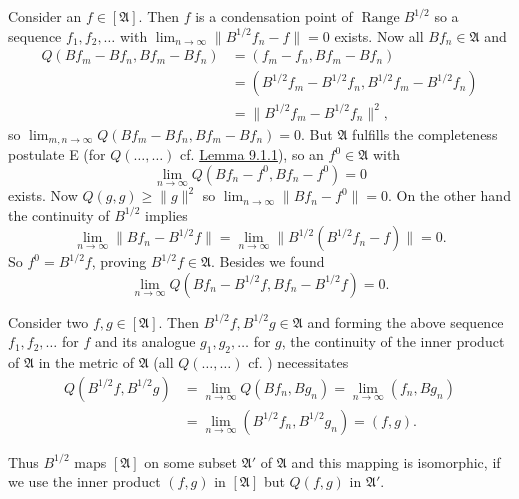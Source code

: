 \documentclass[12pt,b5paper,twoside]{article}
\newcommand{\lemref}[1]{\hyperref[lem:#1]{Lemma #1}}
\begin{document}
Consider an $f\in[\mathfrak A]$. Then $f$ is a condensation point of
$\operatorname{Range}B^{1/2}$ so a sequence $f_1,f_2,\ldots$ with
$\lim_{n\to\infty}\lVert B^{1/2}f_n-f\rVert=0$ exists. Now all
$Bf_n\in\mathfrak A$ and
\begin{align*}
 Q(Bf_m-Bf_n,Bf_m-Bf_n)
 &=(f_m-f_n,Bf_m-Bf_n)\\
 &=(B^{1/2}f_m-B^{1/2}f_n,
    B^{1/2}f_m-B^{1/2}f_n)\\
 &=\lVert B^{1/2}f_m-B^{1/2}f_n\rVert^2,
\end{align*}
so $\lim_{m,n\to\infty}Q(Bf_m-Bf_n,Bf_m-Bf_n)=0$. But
$\mathfrak A$ fulfills the completeness postulate E (for $Q(\ldots,\ldots)$
cf. \lemref{9.1.1}), so an $f^0\in\mathfrak A$ with
\[
 \lim_{n\to\infty}Q(Bf_n-f^0,Bf_n-f^0)=0
\]
exists. Now $Q(g,g)\geq\lVert g\rVert^2$ so
$\lim_{n\to\infty}\lVert Bf_n-f^0\rVert=0$. On the other hand the
continuity of $B^{1/2}$ implies
\[
 \lim_{n\to\infty}\lVert Bf_n-B^{1/2}f\rVert
 =\lim_{n\to\infty}\lVert B^{1/2}(B^{1/2}f_n-f)\rVert=0.
\]
So $f^0=B^{1/2}f$, proving $B^{1/2}f\in\mathfrak A$. Besides we found
\[
 \lim_{n\to\infty}Q(Bf_n-B^{1/2}f,Bf_n-B^{1/2}f)=0.
\]

Consider two $f,g\in[\mathfrak A]$. Then
$B^{1/2}f,B^{1/2}g\in\mathfrak A$ and forming the above sequence
$f_1,f_2,\ldots$ for $f$ and its analogue $g_1,g_2,\ldots$ for $g$, the
continuity of the inner product of $\mathfrak A$ in the metric of
$\mathfrak A$ (all $Q(\ldots,\ldots)$ cf. \cite[p.~65]{ref16}) necessitates
\begin{align*}
 Q(B^{1/2}f,B^{1/2}g)
 &=\lim_{n\to\infty}Q(Bf_n,Bg_n)
  =\lim_{n\to\infty}(f_n,Bg_n)\\
 &=\lim_{n\to\infty}(B^{1/2}f_n,B^{1/2}g_n)=(f,g).
\end{align*}

Thus $B^{1/2}$ maps $[\mathfrak A]$ on some subset $\mathfrak A'$ of
$\mathfrak A$ and this mapping is isomorphic, if we use the inner product
$(f,g)$ in $[\mathfrak A]$ but $Q(f,g)$ in $\mathfrak A'$.
\end{document}
